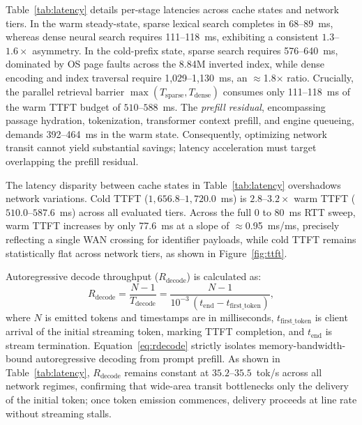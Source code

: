 \documentclass[conference,a4paper]{IEEEtran}
\newcommand{\Tsparse}{T_{\mathrm{sparse}}}
\newcommand{\Tdense}{T_{\mathrm{dense}}}
\newcommand{\Rdecode}{R_{\mathrm{decode}}}
\begin{document}
Table~\ref{tab:latency} details per-stage latencies across cache states and network tiers. In the warm steady-state, sparse lexical search completes in 68--89~ms, whereas dense neural search requires 111--118~ms, exhibiting a consistent $1.3$--$1.6\times$ asymmetry. In the cold-prefix state, sparse search requires 576--640~ms, dominated by OS page faults across the 8.84M inverted index, while dense encoding and index traversal require 1{,}029--1{,}130~ms, an $\approx$1.8$\times$ ratio. Crucially, the parallel retrieval barrier $\max(\Tsparse, \Tdense)$ consumes only 111--118~ms of the warm TTFT budget of $510$--$588$~ms. The \emph{prefill residual}, encompassing passage hydration, tokenization, transformer context prefill, and engine queueing, demands 392--464~ms in the warm state. Consequently, optimizing network transit cannot yield substantial savings; latency acceleration must target overlapping the prefill residual.

The latency disparity between cache states in Table~\ref{tab:latency} overshadows network variations. Cold TTFT ($1{,}656.8$--$1{,}720.0$~ms) is $2.8$--$3.2\times$ warm TTFT ($510.0$--$587.6$~ms) across all evaluated tiers. Across the full 0 to 80~ms RTT sweep, warm TTFT increases by only 77.6~ms at a slope of $\approx$0.95~ms/ms, precisely reflecting a single WAN crossing for identifier payloads, while cold TTFT remains statistically flat across network tiers, as shown in Figure~\ref{fig:ttft}.

Autoregressive decode throughput ($\Rdecode$) is calculated as:
\begin{equation}
    \Rdecode = \frac{N - 1}{T_{\mathrm{decode}}} = \frac{N - 1}{10^{-3}\,(t_{\mathrm{end}} - t_{\mathrm{first\_token}})},
    \label{eq:rdecode}
\end{equation}
where $N$ is emitted tokens and timestamps are in milliseconds, $t_{\mathrm{first\_token}}$ is client arrival of the initial streaming token, marking TTFT completion, and $t_{\mathrm{end}}$ is stream termination. Equation~\eqref{eq:rdecode} strictly isolates memory-bandwidth-bound autoregressive decoding from prompt prefill. As shown in Table~\ref{tab:latency}, $\Rdecode$ remains constant at $35.2$--$35.5$~tok/s across all network regimes, confirming that wide-area transit bottlenecks only the delivery of the initial token; once token emission commences, delivery proceeds at line rate without streaming stalls.

\end{document}
